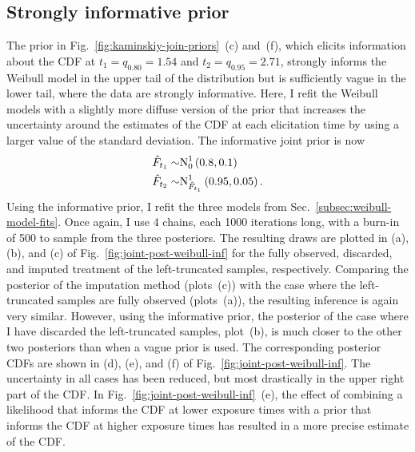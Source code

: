 \subsection{Strongly informative prior} \label{subsec:weibull-model-fits-informative}

The prior in Fig.~\ref{fig:kaminskiy-join-priors}~(c) and~(f), which elicits information about the CDF at $t_1 = q_{0.80} = 1.54$ and $t_2 = q_{0.95} = 2.71$, strongly informs the Weibull model in the upper tail of the distribution but is sufficiently vague in the lower tail, where the data are strongly informative. Here, I refit the Weibull models with a slightly more diffuse version of the prior that increases the uncertainty around the estimates of the CDF at each elicitation time by using a larger value of the standard deviation. The informative joint prior is now
\begin{align*}
    \hat{F}_{t_1} \sim & \hbox{N}^{1}_{0}\left(0.8, 0.1\right)    \\
    \hat{F}_{t_2} \sim & \hbox{N}^{1}_{\hat{F}_{t_1}}\left(0.95, 0.05\right).
\end{align*}
Using the informative prior, I refit the three models from Sec.~\ref{subsec:weibull-model-fits}. Once again, I use 4 chains, each 1000 iterations long, with a burn-in of 500 to sample from the three posteriors. The resulting draws are plotted in (a), (b), and (c) of Fig.~\ref{fig:joint-post-weibull-inf} for the fully observed, discarded, and imputed treatment of the left-truncated samples, respectively. Comparing the posterior of the imputation method (plots~(c)) with the case where the left-truncated samples are fully observed (plots~(a)), the resulting inference is again very similar. However, using the informative prior, the posterior of the case where I have discarded the left-truncated samples, plot~(b), is much closer to the other two posteriors than when a vague prior is used. The corresponding posterior CDFs are shown in (d), (e), and (f) of Fig.~\ref{fig:joint-post-weibull-inf}. The uncertainty in all cases has been reduced, but most drastically in the upper right part of the CDF. In Fig.~\ref{fig:joint-post-weibull-inf}~(e), the effect of combining a likelihood that informs the CDF at lower exposure times with a prior that informs the CDF at higher exposure times has resulted in a more precise estimate of the CDF. 

